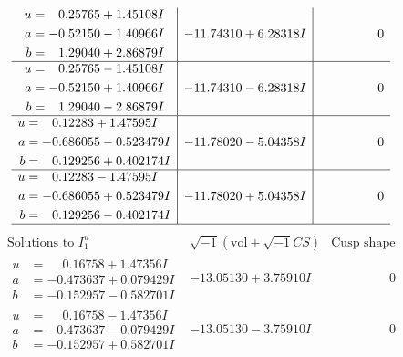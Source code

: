 \documentclass[1p]{elsarticle_modified}
\theoremstyle{definition}
\newcommand{\I}{\sqrt{-1}}
\begin{document}
$$\begin{array}{c|c|c}
\begin{aligned}
u &= \phantom{-}0.25765 + 1.45108 I \\
a &= -0.52150 - 1.40966 I \\
b &= \phantom{-}1.29040 + 2.86879 I\end{aligned}
 & -11.74310 + 6.28318 I & \phantom{-0.000000 } 0 \\ \hline\begin{aligned}
u &= \phantom{-}0.25765 - 1.45108 I \\
a &= -0.52150 + 1.40966 I \\
b &= \phantom{-}1.29040 - 2.86879 I\end{aligned}
 & -11.74310 - 6.28318 I & \phantom{-0.000000 } 0 \\ \hline\begin{aligned}
u &= \phantom{-}0.12283 + 1.47595 I \\
a &= -0.686055 - 0.523479 I \\
b &= \phantom{-}0.129256 + 0.402174 I\end{aligned}
 & -11.78020 - 5.04358 I & \phantom{-0.000000 } 0 \\ \hline\begin{aligned}
u &= \phantom{-}0.12283 - 1.47595 I \\
a &= -0.686055 + 0.523479 I \\
b &= \phantom{-}0.129256 - 0.402174 I\end{aligned}
 & -11.78020 + 5.04358 I & \phantom{-0.000000 } 0\\
 \hline 
 \end{array}$$\newpage$$\begin{array}{c|c|c}  
\text{Solutions to }I^u_{1}& \I (\text{vol} + \sqrt{-1}CS) & \text{Cusp shape}\\
 \hline 
\begin{aligned}
u &= \phantom{-}0.16758 + 1.47356 I \\
a &= -0.473637 + 0.079429 I \\
b &= -0.152957 - 0.582701 I\end{aligned}
 & -13.05130 + 3.75910 I & \phantom{-0.000000 } 0 \\ \hline\begin{aligned}
u &= \phantom{-}0.16758 - 1.47356 I \\
a &= -0.473637 - 0.079429 I \\
b &= -0.152957 + 0.582701 I\end{aligned}
 & -13.05130 - 3.75910 I & \phantom{-0.000000 } 0 \\ \hline\begin{aligned}

\end{aligned}
\end{array}$$
\end{document}
